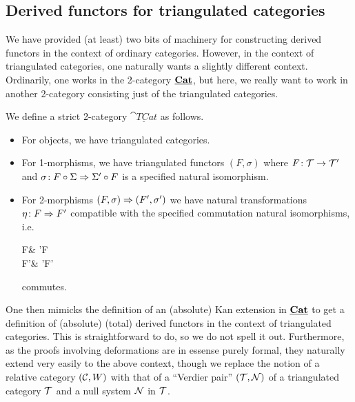 \subsection{Derived functors for triangulated categories}
We have provided (at least) two bits of machinery for constructing derived functors in the context of ordinary categories. However, in the context of triangulated categories,
one naturally wants a slightly different context. Ordinarily, one works in the 2-category \(\underline{\mathbf{Cat}}\), but here, we really want to work in another 2-category consisting
just of the triangulated categories.
\begin{definition}
	We define a strict 2-category \(\underline{\cat{TCat}}\) as follows.
	\begin{itemize}[label=\(\star\)]
	\item For objects, we have triangulated categories.
	\item For 1-morphisms, we have triangulated functors \((F,\sigma)\) where \(F\!:\mathcal{T}\to\mathcal{T}'\) and \(\sigma\!:F\circ\Sigma\Rightarrow\Sigma'\circ F\) is a specified natural isomorphism.
	\item For 2-morphisms \((F,\sigma)\Rightarrow (F',\sigma')\) we have natural transformations \(\eta\!:F\Rightarrow F'\) compatible with the specified commutation natural isomorphisms, i.e.
	\begin{diagram*}
		F\circ\Sigma{} & \Sigma'\circ F \\
		F'\circ\Sigma{} & \Sigma'\circ F'
	\end{diagram*}
	commutes.
	\end{itemize}
\end{definition}

One then mimicks the definition of an (absolute) Kan extension in \(\underline{\mathbf{Cat}}\) to get a definition of (absolute) (total) derived functors in the context of triangulated categories.
This is straightforward to do, so we do not spell it out. Furthermore, as the proofs involving deformations are in essense purely formal, they naturally extend very easily to the above context,
though we replace the notion of a relative category \((\mathcal{C},W)\) with that of a ``Verdier pair'' \((\mathcal{T},\mathcal{N})\) of a triangulated category \(\mathcal{T}\) and a null system \(\mathcal{N}\) in \(\mathcal{T}\).

